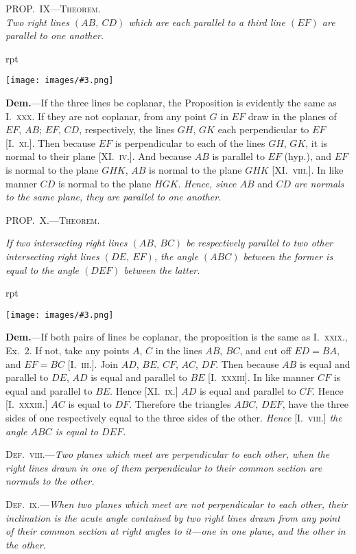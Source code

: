 \documentclass[oneside]{book}
\newcounter{wrapwidth}
\newcommand\myprop[2]{
\bigskip\Needspace*{4\baselineskip}\begin{center}\textsc{#1}\\\medskip\emph{#2}\par\end{center}
}
\newcommand\mypropl[2]{
\bigskip\Needspace*{4\baselineskip}\begin{center}\textsc{#1}\end{center}
\hspace{\parindent}\emph{#2}\par\medskip
}
\newcommand\imgflow[3]{
\setcounter{wrapwidth}{#1}
\begin{wrapfigure}[#2]{r}{\value{wrapwidth}pt}
\begin{center}
\vspace{-0.3in}
\texttt{[image: images/\#3.png]}
\end{center}
\end{wrapfigure}
}
\begin{document}
\myprop{PROP\@.~IX---Theorem.}{Two right lines $(AB,\ CD)$ which are each parallel to a
third line $(EF)$ are parallel to one another.}

\imgflow{133}{7}{f223}

\textbf{Dem.}---If the three lines be coplanar, the Proposition
is evidently the same
as I.~\textsc{xxx}. If they are not
coplanar, from any point $G$
in $EF$ draw in the planes of
$EF$, $AB$; $EF$, $CD$, respectively,
the lines $GH$, $GK$ each
perpendicular\label{perpendiclar}
to $EF$ [I.~\textsc{xi.}].
Then because $EF$ is perpendicular to each of the lines
$GH$, $GK$, it is normal to their plane [XI\@.~\textsc{iv.}]. And
because $AB$ is parallel to $EF$ (hyp.), and $EF$ is normal
to the plane $GHK$, $AB$ is normal to the plane $GHK$
[XI\@.~\textsc{viii.}]. In like manner $CD$ is normal to the plane
$HGK$. \emph{Hence, since $AB$} and $CD$ \emph{are normals to the same
plane, they are parallel to one another.}

\mypropl{PROP\@.~X.---Theorem.}{If two intersecting right lines $(AB,\ BC)$ be respectively
parallel to two other intersecting right lines $(DE,\ EF)$,
the angle $(ABC)$ between the former is equal to the angle
$(DEF)$ between the latter.}

\imgflow{120}{10}{f224}

\textbf{Dem.}---If both pairs of lines be coplanar, the proposition
is the same as I.~\textsc{xxix.},
Ex.~2. If not, take any points
$A$, $C$ in the lines $AB$, $BC$, and
cut off $ED = BA$, and $EF = BC$
[I.~\textsc{iii.}]. Join $AD$, $BE$, $CF$,
$AC$, $DF$. Then because $AB$ is
equal and parallel to $DE$, $AD$
is equal and parallel to $BE$
[I.~\textsc{xxxiii}]. In like manner
$CF$ is equal and parallel to $BE$.
Hence [XI\@.~\textsc{ix.}] $AD$ is equal
and parallel to $CF$. Hence [I.~\textsc{xxxiii.}] $AC$ is equal to
$DF$. Therefore the triangles $ABC$, $DEF$, have the
three sides of one respectively equal to the three sides
of the other. \emph{Hence} [I.~\textsc{viii.}] \emph{the angle $ABC$ is equal
to $DEF$.}

\textsc{Def.~viii.}---\emph{Two planes which meet are perpendicular
to each other, when the right lines drawn in one of them
perpendicular to their common section are normals to the
other.}

\textsc{Def.~ix.}---\emph{When two planes which meet are not perpendicular
to each other, their inclination is the acute angle
contained by two right lines drawn from any point of their
common section at right angles to it---one in one plane, and
the other in the other.}
\end{document}

